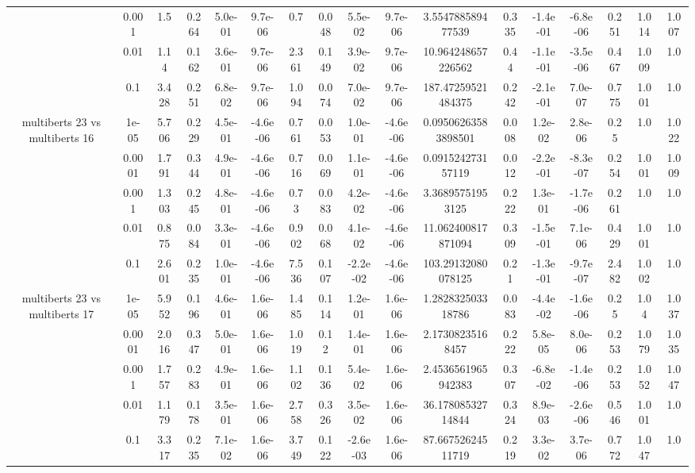 \begin{tabular}{|c|c|c|c|c|c|c|c|c|c|c|c|c|c|c|c|c|}
 & 0.001 & 1.5 & 0.264 & 5.0e-01 & 9.7e-06 & 0.7 & 0.048 & 5.5e-02 & 9.7e-06 & 3.554788589477539 & 0.335 & -1.4e-01 & -6.8e-06 & 0.251 & 1.014 & 1.007 \\
 & 0.01 & 1.14 & 0.162 & 3.6e-01 & 9.7e-06 & 2.361 & 0.149 & 3.9e-02 & 9.7e-06 & 10.964248657226562 & 0.44 & -1.1e-01 & -3.5e-06 & 0.467 & 1.009 & 1.0 \\
 & 0.1 & 3.428 & 0.251 & 6.8e-02 & 9.7e-06 & 1.094 & 0.074 & 7.0e-02 & 9.7e-06 & 187.47259521484375 & 0.242 & -2.1e-01 & 7.0e-07 & 0.775 & 1.001 & 1.0 \\
\hline
\multirow{5}{*}{multiberts 23 vs multiberts 16} & 1e-05 & 5.706 & 0.229 & 4.5e-01 & -4.6e-06 & 0.761 & 0.053 & 1.0e-01 & -4.6e-06 & 0.09506263583898501 & 0.008 & 1.2e-02 & 2.8e-06 & 0.25 & 1.0 & 1.022 \\
 & 0.0001 & 1.791 & 0.344 & 4.9e-01 & -4.6e-06 & 0.716 & 0.069 & 1.1e-01 & -4.6e-06 & 0.091524273157119 & 0.012 & -2.2e-01 & -8.3e-07 & 0.254 & 1.001 & 1.009 \\
 & 0.001 & 1.303 & 0.245 & 4.8e-01 & -4.6e-06 & 0.73 & 0.083 & 4.2e-02 & -4.6e-06 & 3.36895751953125 & 0.222 & 1.3e-01 & -1.7e-06 & 0.261 & 1.0 & 1.0 \\
 & 0.01 & 0.875 & 0.084 & 3.3e-01 & -4.6e-06 & 0.902 & 0.068 & 4.1e-02 & -4.6e-06 & 11.062400817871094 & 0.309 & -1.5e-01 & 7.1e-06 & 0.429 & 1.001 & 1.0 \\
 & 0.1 & 2.601 & 0.235 & 1.0e-01 & -4.6e-06 & 7.536 & 0.107 & -2.2e-02 & -4.6e-06 & 103.29132080078125 & 0.21 & -1.3e-01 & -9.7e-07 & 2.482 & 1.002 & 1.0 \\
\hline
\multirow{5}{*}{multiberts 23 vs multiberts 17} & 1e-05 & 5.952 & 0.196 & 4.6e-01 & 1.6e-06 & 1.485 & 0.114 & 1.2e-01 & 1.6e-06 & 1.282832503318786 & 0.083 & -4.4e-02 & -1.6e-06 & 0.25 & 1.04 & 1.037 \\
 & 0.0001 & 2.016 & 0.347 & 5.0e-01 & 1.6e-06 & 1.019 & 0.12 & 1.4e-01 & 1.6e-06 & 2.17308235168457 & 0.222 & 5.8e-05 & 8.0e-06 & 0.253 & 1.079 & 1.035 \\
 & 0.001 & 1.757 & 0.283 & 4.9e-01 & 1.6e-06 & 1.102 & 0.136 & 5.4e-02 & 1.6e-06 & 2.4536561965942383 & 0.307 & -6.8e-02 & -1.4e-06 & 0.253 & 1.052 & 1.047 \\
 & 0.01 & 1.179 & 0.178 & 3.5e-01 & 1.6e-06 & 2.758 & 0.326 & 3.5e-02 & 1.6e-06 & 36.17808532714844 & 0.324 & 8.9e-03 & -2.6e-06 & 0.546 & 1.001 & 1.0 \\
 & 0.1 & 3.317 & 0.235 & 7.1e-02 & 1.6e-06 & 3.749 & 0.122 & -2.6e-03 & 1.6e-06 & 87.66752624511719 & 0.219 & 3.3e-02 & 3.7e-06 & 0.772 & 1.047 & 1.0 \\

\end{tabular}
